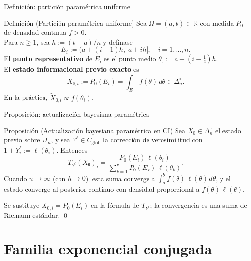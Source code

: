 \documentclass[12pt, aspectratio=169]{beamer}
\newcommand{\R}{\mathbb{R}}
\newcommand{\Dni}{\Delta_n^\circ}
\newcommand{\Glob}{C_{\mathrm{glob}}}
\begin{document}
\begin{frame}{Definición: partición paramétrica uniforme}

  \begin{block}{Definición (Partición paramétrica uniforme)}
    Sea $\Omega = (a, b) \subset \R$ con medida $P_0$ de densidad continua $f > 0$.\\[4pt]
    Para $n \ge 1$, sea $h := (b-a)/n$ y defínase
    \[
      E_i := \bigl(a + (i-1)h,\; a + ih\bigr], \quad i = 1, \dots, n.
    \]
    El \textbf{punto representativo} de $E_i$ es el punto medio $\theta_i := a + (i - \tfrac{1}{2})h$.\\[6pt]
    El \textbf{estado informacional previo exacto} es
    \[
      X_{0,i} := P_0(E_i) = \int_{E_i} f(\theta)\,d\theta \in \Dni.
    \]
    En la práctica, $\widetilde X_{0,i} \propto f(\theta_i)$.
  \end{block}
\end{frame}

\begin{frame}{Proposición: actualización bayesiana paramétrica}

  \begin{alertblock}{Proposición (Actualización bayesiana paramétrica en CI)}
    Sea $X_0 \in \Dni$ el estado previo sobre $\Pi_n$, y sea
    $Y^\ell \in \Glob$ la corrección de verosimilitud con
    $1 + Y_i^\ell := \ell(\theta_i)$.  Entonces
    \[
      T_{Y^\ell}(X_0)_i
      = \frac{P_0(E_i)\,\ell(\theta_i)}{\displaystyle\sum_{k=1}^n P_0(E_k)\,\ell(\theta_k)}.
    \]
    Cuando $n \to \infty$ (con $h \to 0$), esta suma converge a
    $\int_a^b f(\theta)\,\ell(\theta)\,d\theta$, y el estado converge
    al posterior continuo con densidad proporcional a $f(\theta)\,\ell(\theta)$.
  \end{alertblock}

  \vspace{4pt}
  \small Se sustituye $X_{0,i} = P_0(E_i)$ en la fórmula de $T_{Y^\ell}$;
  la convergencia es una suma de Riemann estándar. \qed
\end{frame}

\section{Familia exponencial conjugada}
\end{document}
